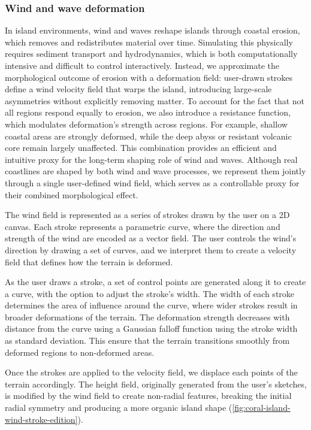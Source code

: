 \subsubsection{Wind and wave deformation}
\label{sec:coral-island-wind-deformation}

In island environments, wind and waves reshape islands through coastal erosion, which removes and redistributes material over time. Simulating this physically requires sediment transport and hydrodynamics, which is both computationally intensive and difficult to control interactively. Instead, we approximate the morphological outcome of erosion with a deformation field: user-drawn strokes define a wind velocity field that warps the island, introducing large-scale asymmetries without explicitly removing matter. To account for the fact that not all regions respond equally to erosion, we also introduce a resistance function, which modulates deformation's strength across regions. For example, shallow coastal areas are strongly deformed, while the deep abyss or resistant volcanic core remain largely unaffected. This combination provides an efficient and intuitive proxy for the long-term shaping role of wind and waves.
Although real coastlines are shaped by both wind and wave processes, we represent them jointly through a single user-defined wind field, which serves as a controllable proxy for their combined morphological effect.

The wind field is represented as a series of strokes drawn by the user on a 2D canvas. Each stroke represents a parametric curve, where the direction and strength of the wind are encoded as a vector field. The user controls the wind's direction by drawing a set of curves, and we interpret them to create a velocity field that defines how the terrain is deformed.

As the user draws a stroke, a set of control points are generated along it to create a curve, with the option to adjust the stroke's width. The width of each stroke determines the area of influence around the curve, where wider strokes result in broader deformations of the terrain.
The deformation strength decreases with distance from the curve using a Gaussian falloff function using the stroke width as standard deviation. This ensure that the terrain transitions smoothly from deformed regions to non-deformed areas.

Once the strokes are applied to the velocity field, we displace each points of the terrain accordingly. The height field, originally generated from the user's sketches, is modified by the wind field to create non-radial features, breaking the initial radial symmetry and producing a more organic island shape (\cref{fig:coral-island-wind-stroke-edition}).



